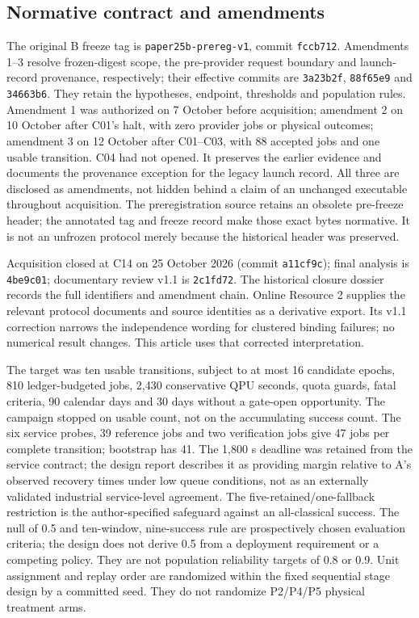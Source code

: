 \documentclass[11pt,a4paper]{article}
\begin{document}
\subsection{Normative contract and amendments}
The original B freeze tag is \texttt{paper25b-prereg-v1}, commit \texttt{fccb712}. Amendments 1--3 resolve frozen-digest scope, the pre-provider request boundary and launch-record provenance, respectively; their effective commits are \texttt{3a23b2f}, \texttt{88f65e9} and \texttt{34663b6}. They retain the hypotheses, endpoint, thresholds and population rules. Amendment 1 was authorized on 7 October before acquisition; amendment 2 on 10 October after C01's halt, with zero provider jobs or physical outcomes; amendment 3 on 12 October after C01--C03, with 88 accepted jobs and one usable transition. C04 had not opened. It preserves the earlier evidence and documents the provenance exception for the legacy launch record. All three are disclosed as amendments, not hidden behind a claim of an unchanged executable throughout acquisition. The preregistration source retains an obsolete pre-freeze header; the annotated tag and freeze record make those exact bytes normative. It is not an unfrozen protocol merely because the historical header was preserved.

Acquisition closed at C14 on 25 October 2026 (commit \texttt{a11cf9c}); final analysis is \texttt{4be9c01}; documentary review v1.1 is \texttt{2c1fd72}. The historical closure dossier records the full identifiers and amendment chain. Online Resource 2 supplies the relevant protocol documents and source identities as a derivative export. Its v1.1 correction narrows the independence wording for clustered binding failures; no numerical result changes. This article uses that corrected interpretation.

The target was ten usable transitions, subject to at most 16 candidate epochs, 810 ledger-budgeted jobs, 2,430 conservative QPU seconds, quota guards, fatal criteria, 90 calendar days and 30 days without a gate-open opportunity. The campaign stopped on usable count, not on the accumulating success count. The six service probes, 39 reference jobs and two verification jobs give 47 jobs per complete transition; bootstrap has 41. The 1,800 s deadline was retained from the service contract; the design report describes it as providing margin relative to A's observed recovery times under low queue conditions, not as an externally validated industrial service-level agreement. The five-retained/one-fallback restriction is the author-specified safeguard against an all-classical success. The null of 0.5 and ten-window, nine-success rule are prospectively chosen evaluation criteria; the design does not derive 0.5 from a deployment requirement or a competing policy. They are not population reliability targets of 0.8 or 0.9. Unit assignment and replay order are randomized within the fixed sequential stage design by a committed seed. They do not randomize P2/P4/P5 physical treatment arms.
\end{document}
